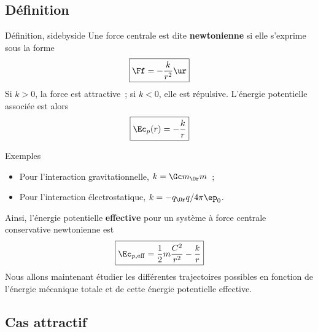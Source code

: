\documentclass[../main/main.tex]{subfiles}
\begin{document}
\subsection{Définition}
\begin{tdefi}{Définition, sidebyside}
    Une force centrale est dite \textbf{newtonienne} si elle s'exprime sous la
    forme
    \[\boxed{\Ff = -\frac{k}{r^2}\ur}\]
    Si $k>0$, la force est attractive~; si $k<0$, elle est répulsive.
    \tcblower
    L'énergie potentielle associée est alors
    \[\boxed{\Ec_p(r) = -\frac{k}{r}}\]
\end{tdefi}
\begin{rexem}{Exemples}
    \begin{itemize}
        \item Pour l'interaction gravitationnelle, $k = \Gc m_\Or m$~;
        \item Pour l'interaction électrostatique, $k = -q_\Or q/4\pi\ep_0$.
    \end{itemize}
\end{rexem}

Ainsi, l'énergie potentielle \textbf{effective} pour un système à force centrale
conservative newtonienne est
\[\boxed{\Ec_{p,\rm eff} = \frac{1}{2}m\frac{C^2}{r^2} - \frac{k}{r}}\]
Nous allons maintenant étudier les différentes trajectoires possibles en
fonction de l'énergie mécanique totale et de cette énergie potentielle
effective.

\subsection{Cas attractif}
\end{document}
